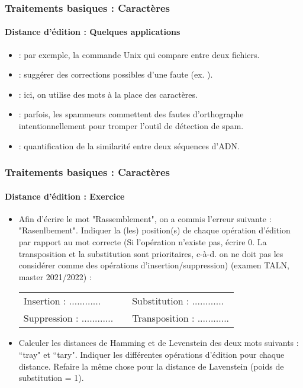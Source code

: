 \documentclass[xcolor=table]{beamer}
\begin{document}
\begin{frame}
\frametitle{Traitements basiques : Caractères}
\framesubtitle{Distance d'édition : Quelques applications}

\begin{itemize}
	\item {} : par exemple, la commande Unix  qui compare entre deux fichiers.
	\item {} : suggérer des corrections possibles d'une faute (ex. ).
	\item {} : ici, on utilise des mots à la place des caractères.
	\item {} : parfois, les spammeurs commettent des fautes d'orthographe intentionnellement pour tromper l'outil de détection de spam.
	\item {} : quantification de la similarité entre deux séquences d'ADN.
\end{itemize}

\end{frame}

\begin{frame}
	\frametitle{Traitements basiques : Caractères}
	\framesubtitle{Distance d'édition : Exercice}
	
	\begin{itemize}
		\item Afin d'écrire le mot "Rassemblement",  on a commis l'erreur suivante : "Rasenlbement". Indiquer la (les) position(s) de chaque opération d'édition par rapport au mot correcte (Si l'opération n'existe pas, écrire 0. La transposition et la substitution sont prioritaires, c-à-d. on ne doit pas les considérer comme des opérations d'insertion/suppression) (examen TALN, master 2021/2022) :
		\begin{tabular}{|lll|}
			\hline 
			Insertion : ............ & & Substitution : ............ \\
			Suppression : ............ & & Transposition : ............ \\
			\hline
		\end{tabular}
		
		\item Calculer les distances de Hamming et de  Levenstein des deux mots suivants : ``tray" et ``tary".
		Indiquer les différentes opérations d'édition pour chaque distance. Refaire la même chose pour la distance de Lavenstein (poids de substitution = 1).
	\end{itemize}
	
\end{frame}
\end{document}
